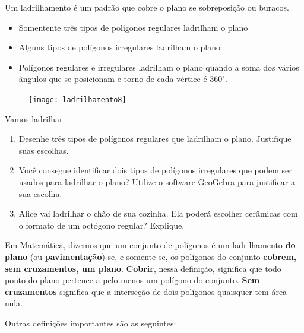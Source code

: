 
Um ladrilhamento é um padrão que cobre o plano se sobreposição ou buracos.

\begin{itemize}
\item Somentente três tipos de polígonos regulares ladrilham o plano
\item Alguns tipos de polígonos irregulares ladrilham o plano
\item Polígonos regulares e irregulares ladrilham o plano quando a soma dos vários ângulos que se posicionam e torno de cada vértice é $360^{\circ}$.
\end{itemize}

\begin{figure}[H]
\centering
\texttt{[image: ladrilhamento8]}
\end{figure}

\begin{task}{Vamos ladrilhar}

\begin{enumerate}
	\item Desenhe três tipos de polígonos regulares que ladrilham o plano. Justifique suas escolhas.
	\item Você consegue identificar dois tipos de polígonos irregulares que podem ser usados para ladrilhar o plano? Utilize o software GeoGebra para justificar a sua escolha.
	\item Alice vai ladrilhar o chão de sua cozinha. Ela poderá escolher cerâmicas com o formato de um octógono regular? Explique.
\end{enumerate}

\end{task}



Em Matemática, dizemos que um conjunto de polígonos é um ladrilhamento \textbf{do plano} (ou \textbf{pavimentação}) se, e somente se, os polígonos do conjunto \textbf{cobrem, sem cruzamentos, um plano}. \textbf{Cobrir}, nessa definição, significa que todo ponto do plano pertence a pelo menos um polígono do conjunto. \textbf{Sem cruzamentos} significa que a interseção de dois polígonos quaisquer tem área nula.

Outras definições importantes são as seguintes:

